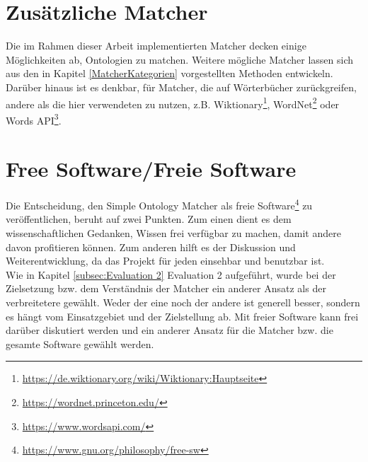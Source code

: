 \section{Zusätzliche Matcher}
Die im Rahmen dieser Arbeit implementierten Matcher decken einige Möglichkeiten
ab, Ontologien zu matchen. Weitere mögliche Matcher lassen sich aus den in
Kapitel \ref{MatcherKategorien} vorgestellten Methoden entwickeln. Darüber
hinaus ist es denkbar, für Matcher, die auf Wörterbücher zurückgreifen, andere 
als die hier verwendeten zu nutzen, z.B.
Wiktionary\footnote{\url{https://de.wiktionary.org/wiki/Wiktionary:Hauptseite}},
WordNet\footnote{\url{https://wordnet.princeton.edu/}} oder Words
API\footnote{\url{https://www.wordsapi.com/}}.

\section{Free Software/Freie Software}
Die Entscheidung, den Simple Ontology Matcher als freie
Software\footnote{\url{https://www.gnu.org/philosophy/free-sw}} zu veröffentlichen, beruht auf zwei Punkten. Zum einen dient es dem
wissenschaftlichen Gedanken, Wissen frei verfügbar zu machen, damit andere davon
profitieren können. Zum anderen hilft es der Diskussion und Weiterentwicklung,
da das Projekt für jeden einsehbar und benutzbar ist.\\
Wie in Kapitel \ref{subsec:Evaluation 2} Evaluation 2 aufgeführt, wurde bei der
Zielsetzung bzw. dem Verständnis der Matcher ein anderer Ansatz als der
verbreitetere gewählt. Weder der eine noch der andere ist generell besser,
sondern es hängt vom Einsatzgebiet und der Zielstellung ab. Mit freier Software
kann frei darüber diskutiert werden und ein anderer Ansatz für die Matcher bzw.
die gesamte Software gewählt werden.

\cleardoublepage
\pagebreak[4]